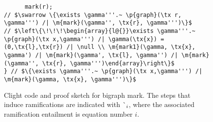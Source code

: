 \begin{figure}
\begin{lstlisting}
      mark(r);
// $\swarrow \{\exists \gamma'''.~ \p{graph}(\tx r, \gamma''') /| \m{mark}(\gamma'', \tx{r}, \gamma''')\}$
// $\left\{\!\!\!\begin{array}{l@{}}\exists \gamma'''.~ \p{graph}(\tx x,\gamma''') /| \gamma(\tx{x}) = (0,\tx{l},\tx{r}) /| \null \\ \m{mark1}(\gamma, \tx{x}, \gamma') /| \m{mark}(\gamma', \tx{l}, \gamma'') /| \m{mark}(\gamma'', \tx{r}, \gamma''')\end{array}\right\}$
} // $\{\exists \gamma'''.~ \p{graph}(\tx x,\gamma''') /| \m{mark}(\gamma, \tx{x}, \gamma''')\}$
\end{lstlisting}
\caption{Clight code and proof sketch for bigraph mark. {\color{magenta} The steps that induce
  ramifications are indicated with $\lightning_i$, where the associated ramification entailment is equation number $i$.}} %
\label{fig:markgraph}
\end{figure}
